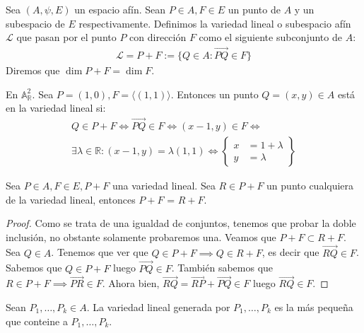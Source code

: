 \documentclass[14pt]{book}
\begin{document}
\begin{dfn}
	Sea $(A, \psi, E)$ un espacio afín. Sean $P \in A, F \in E$ un punto de $A$ y un subespacio de $E$ respectivamente. Definimos la variedad lineal o subespacio afín $\mathcal{L}$ que pasan por el punto $P$ con dirección $F$ como el siguiente subconjunto de $A$:
	\begin{align*}
		\mathcal{L} = P + F := \{Q \in A : \overrightarrow{PQ} \in F\}
	\end{align*}
	Diremos que $\dim P + F = \dim F$.
\end{dfn}

\begin{ej}
	En $\mathbb{A}_\mathbb{R}^2$. Sea $P = (1,0), F = \langle(1,1)\rangle$. Entonces un punto $Q = (x,y) \in A$ está en la variedad lineal si:
	\begin{align*}
		Q \in P + F \iff \overrightarrow{PQ} \in F \iff (x - 1, y) \in F \iff \\
		\exists \lambda \in \mathbb{R} : (x - 1, y) = \lambda(1, 1) \iff \left\lbrace\begin{array}{cc}
			x &= 1 + \lambda \\
			y &= \lambda
		\end{array}\right\rbrace
	\end{align*}
\end{ej}

\begin{pro}
	Sea $P \in A, F \in E, P + F$ una variedad lineal. Sea $R \in P + F$ un punto cualquiera de la variedad lineal, entonces $P + F$ = $R + F$.
\end{pro}

\begin{proof}
	Como se trata de una igualdad de conjuntos, tenemos que probar la doble inclusión, no obstante solamente probaremos una. Veamos que $P + F \subset R + F$. Sea $Q \in A$. Tenemos que ver que $Q \in P + F \implies Q \in R + F$, es decir que $\overrightarrow{RQ} \in F$. Sabemos que $Q \in P + F$ luego $\overrightarrow{PQ} \in F$. También sabemos que $R \in P + F \implies \overrightarrow{PR} \in F$. Ahora bien, $\overrightarrow{RQ} = \overrightarrow{RP} + \overrightarrow{PQ} \in F$ luego $\overrightarrow{RQ} \in F$.
\end{proof}

\begin{dfn}
	Sean $P_1, \dots, P_k \in A$. La variedad lineal generada por $P_1, \dots, P_k$ es la más pequeña que conteine a $P_1, \dots, P_k$.
\end{dfn}
\end{document}
